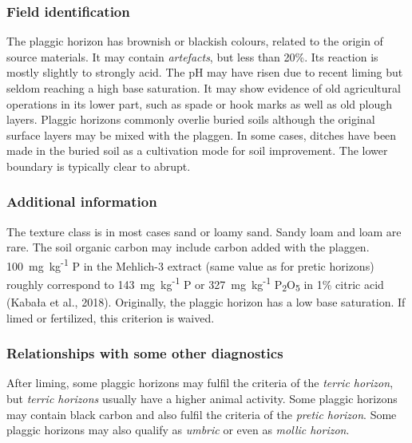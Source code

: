 \documentclass[
  letterpaper,
  DIV=11,
  numbers=noendperiod]{scrreprt}
\begin{document}
\hypertarget{field-identification-21}{%
\subsubsection{Field identification}\label{field-identification-21}}

The plaggic horizon has brownish or blackish colours, related to the
origin of source materials. It may contain \emph{artefacts}, but less
than 20\%. Its reaction is mostly slightly to strongly acid. The pH may
have risen due to recent liming but seldom reaching a high base
saturation. It may show evidence of old agricultural operations in its
lower part, such as spade or hook marks as well as old plough layers.
Plaggic horizons commonly overlie buried soils although the original
surface layers may be mixed with the plaggen. In some cases, ditches
have been made in the buried soil as a cultivation mode for soil
improvement. The lower boundary is typically clear to abrupt.

\hypertarget{additional-information-15}{%
\subsubsection{Additional information}\label{additional-information-15}}

The texture class is in most cases sand or loamy sand. Sandy loam and
loam are rare. The soil organic carbon may include carbon added with the
plaggen. 100~mg~kg\textsuperscript{-1} P in the Mehlich-3 extract (same
value as for pretic horizons) roughly correspond to
143~mg~kg\textsuperscript{-1} P or 327~mg~kg\textsuperscript{-1}
P\textsubscript{2}O\textsubscript{5} in 1\% citric acid (Kabała et al.,
2018). Originally, the plaggic horizon has a low base saturation. If
limed or fertilized, this criterion is waived.

\hypertarget{relationships-with-some-other-diagnostics-28}{%
\subsubsection{Relationships with some other
diagnostics}\label{relationships-with-some-other-diagnostics-28}}

After liming, some plaggic horizons may fulfil the criteria of the
\emph{terric horizon}, but \emph{terric horizons} usually have a higher
animal activity. Some plaggic horizons may contain black carbon and also
fulfil the criteria of the \emph{pretic horizon}. Some plaggic horizons
may also qualify as \emph{umbric} or even as \emph{mollic horizon}.
\end{document}
